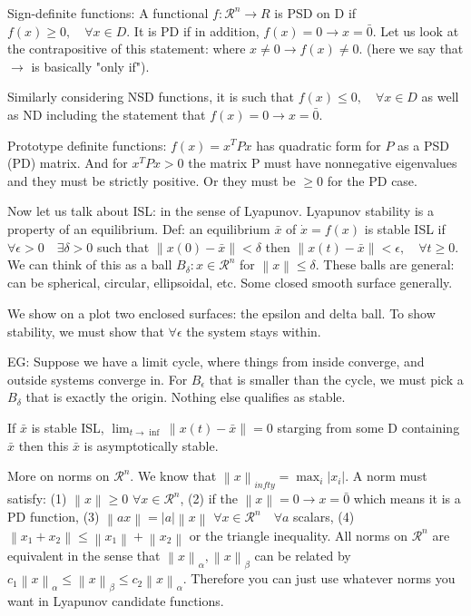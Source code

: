 \documentclass[11pt]{article}
\newcommand{\norm}[1]{\left\lVert#1\right\rVert}
\begin{document}
 Sign-definite functions: A functional $f:\mathcal{R}^n \rightarrow R$ is PSD on D if $f(x)\geq 0, \quad \forall x \in D$. It is PD if in addition, $f(x)=0 \rightarrow x = \bar{0}$. Let us look at the contrapositive of this statement: where $x \neq 0 \rightarrow f(x) \neq 0$. (here we say that $\rightarrow$ is basically "only  if").

 Similarly considering NSD functions, it is such that $f(x) \leq 0, \quad \forall x \in D$ as well as ND including the statement that $f(x)=0 \rightarrow x = \bar{0}$.

 Prototype definite functions: $f(x) = x^TPx$ has quadratic form for $P$ as a PSD (PD) matrix. And for $x^TPx > 0$ the matrix P must have nonnegative eigenvalues and they must be strictly positive. Or they must be $\geq 0$ for the PD case. 


 Now let us talk about ISL: in the sense of Lyapunov. Lyapunov stability is a property of an equilibrium. Def: an equilibrium $\bar{x}$ of $\dot{x}=f(x)$ is stable ISL if $\forall \epsilon >0 \quad \exists \delta >0$ such that $\norm{x(0) - \bar{x}} < \delta$ then $\norm{ x(t) - \bar{x}} < \epsilon,\quad \forall t \geq 0$. We can think of this as a ball $B_\delta: x\in \mathcal{R}^n$ for $\norm{x}\leq \delta$. These balls are general: can be spherical, circular, ellipsoidal, etc. Some closed smooth surface generally. 

 We show on a plot two enclosed surfaces: the epsilon and delta ball. To show stability, we must show that $\forall \epsilon$ the system stays within.

 EG: Suppose we have a limit cycle, where things from inside converge, and outside systems converge in. For $B_\epsilon$ that is smaller than the cycle, we must pick a $B_\delta$ that is exactly the origin.  Nothing else qualifies as stable.

 If $\bar{x}$ is stable ISL, $\lim_{t\rightarrow \inf} \norm{x(t) - \bar{x}} = 0$ starging from some D containing $\bar{x}$  then this $\bar{x}$ is asymptotically stable.

More on norms on $\mathcal{R}^n$. We know that $\norm{x}_{infty} = \max_i \rvert x_i \rvert$. A norm must satisfy: (1) $\norm{x}\geq 0$ $\forall x \in \mathcal{R}^n$, (2) if the $\norm{x} =  0 \rightarrow x = \bar{0}$ which means it is a PD function, (3) $\norm{ax} = \rvert a \rvert \norm{x}$ $\forall x \in \mathcal{R}^n \quad \forall a$ scalars, (4) $\norm{x_1 + x_2} \leq \norm{x_1} + \norm{x_2}$ or the triangle inequality. All norms on $\mathcal{R}^n$ are equivalent in the sense that $\norm{x}_\alpha, \norm{x}_\beta$ can be related by $c_1 \norm{x}_\alpha \leq \norm{x}_\beta \leq c_2 \norm{x}_\alpha$. Therefore you can just use whatever norms you want in Lyapunov candidate functions. 
\end{document}
